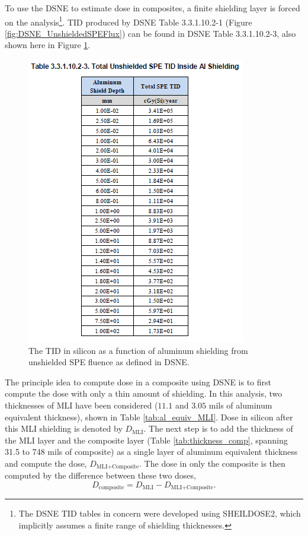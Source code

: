 \documentclass{hitec}
\begin{document}
To use the DSNE to estimate dose in composites, a finite shielding layer is forced on the analysis\footnote{The DSNE TID tables in concern were developed using SHEILDOSE2, which implicitly assumes a finite range of shielding thicknesses.}. TID produced by DSNE Table 3.3.1.10.2-1 (Figure \ref{fig:DSNE_UnshieldedSPEFlux}) can be found in DSNE Table 3.3.1.10.2-3, also shown here in Figure \ref{fig:DSNE_UnshieldedSPETID}.

\begin{figure}[h!]
	\centering
	\includegraphics[scale=1.0]{DSNE_3.3.1.10.2-3.png}
	\caption{The TID in silicon as a function of aluminum shielding from unshielded SPE fluence as defined in DSNE.}\label{fig:DSNE_UnshieldedSPETID}
\end{figure}

The principle idea to compute dose in a composite using DSNE is to first compute the dose with only a thin amount of shielding. In this analysis, two thicknesses of MLI have been considered ($11.1$ and $3.05$ mils of aluminum equivalent thickness), shown in Table \ref{tab:al_equiv_MLI}. Dose in silicon after this MLI shielding is denoted by $D_{\text{MLI}}$. The next step is to add the thickness of the MLI layer and the composite layer (Table \ref{tab:thickness_comp}, spanning 31.5 to 748 mils of composite) as a single layer of aluminum equivalent thickness and compute the dose, $D_{\text{MLI+Composite}}$. The dose in only the composite is then computed by the difference between these two doses,
\begin{equation}
D_{\text{composite}} = D_{\text{MLI}} - D_{\text{MLI+Composite}}.
\end{equation}
\end{document}
